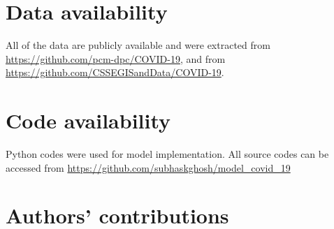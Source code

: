 \documentclass[authoryear,preprint]{elsarticle}
\begin{document}
\section*{Data availability}
All of the data are publicly available and were extracted from \url{https://github.com/pcm-dpc/COVID-19}, and from \url{https://github.com/CSSEGISandData/COVID-19}.

\section*{Code availability}
Python codes were used for model implementation. All source codes can be accessed from \url{https://github.com/subhaskghosh/model_covid_19}

\section*{Authors' contributions}
\label{SEC5}


	
\end{document}
